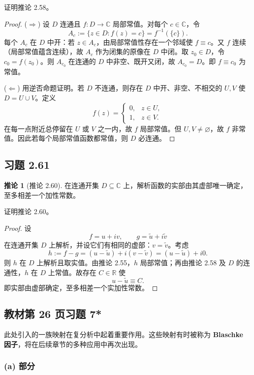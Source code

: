 \documentclass[11pt,a4paper]{article}
\newcommand{\R}{\mathbb{R}}
\newcommand{\C}{\mathbb{C}}
\theoremstyle{definition}
\newtheorem{corollary}[theorem]{推论}
\begin{document}
证明推论 2.58。

\begin{proof}
($\Rightarrow$) 设 $D$ 连通且 $f:D\to\C$ 局部常值。对每个 $c\in\C$，令
\[
  A_c:=\{z\in D: f(z)=c\}=f^{-1}(\{c\}).
\]
每个 $A_c$ 在 $D$ 中开：若 $z\in A_c$，由局部常值性存在一个邻域使 $f\equiv c$。又 $f$ 连续（局部常值蕴含连续），故 $A_c$ 作为闭集的原像在 $D$ 中闭。取 $z_0\in D$，令 $c_0=f(z_0)$。则 $A_{c_0}$ 在连通的 $D$ 中非空、既开又闭，故 $A_{c_0}=D$。即 $f\equiv c_0$ 为常值。

($\Leftarrow$) 用逆否命题证明。若 $D$ 不连通，则存在 $D$ 中开、非空、不相交的 $U,V$ 使 $D=U\cup V$。定义
\[
  f(z)=
  \begin{cases}
    0,& z\in U,\\
    1,& z\in V.
  \end{cases}
\]
在每一点附近总停留在 $U$ 或 $V$ 之一内，故 $f$ 局部常值。但 $U,V\neq\varnothing$，故 $f$ 非常值。因此若每个局部常值函数都常值，则 $D$ 必连通。
\end{proof}

\subsection{习题 2.61}

\begin{corollary}[推论 2.60]
  在连通开集 $D \subseteq \C$ 上，解析函数的实部由其虚部唯一确定，至多相差一个加性常数。
\end{corollary}

证明推论 2.60。

\begin{proof}
设
\[
  f=u+iv,\qquad g=\tilde u+i\tilde v
\]
在连通开集 $D$ 上解析，并设它们有相同的虚部：$v=\tilde v$。考虑
\[
  h:=f-g=(u-\tilde u)+i(v-\tilde v)= (u-\tilde u)+i0.
\]
则 $h$ 在 $D$ 上解析且取实值。由推论 2.55，$h$ 局部常值；再由推论 2.58 及 $D$ 的连通性，$h$ 在 $D$ 上常值。故存在 $C\in\R$ 使
\[
  u-\tilde u\equiv C.
\]
即实部由虚部确定，至多相差一个实加性常数。
\end{proof}

\subsection{教材第 26 页习题 7*}

此处引入的一族映射在复分析中起着重要作用。这些映射有时被称为 \textbf{Blaschke 因子}，将在后续章节的多种应用中再次出现。

\subsubsection*{(a) 部分}
\end{document}
